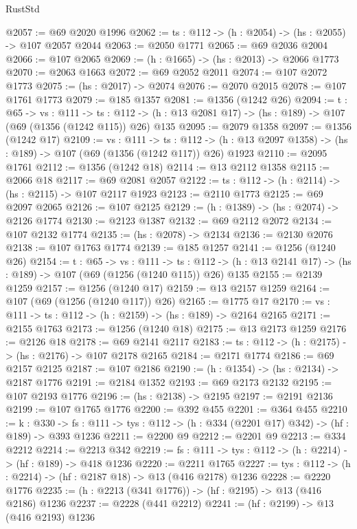\begin{lexlean}{RustStd}
\begin{coremodule}
{\begin{coremodule}
{{{@2057 := @69 @2020 @1996
@2062 := {ts : @112} -> (h : @2054) -> (hs : @2055) -> @107 @2057 @2044
@2063 := @2050 @1771
@2065 := @69 @2036 @2004
@2066 := @107 @2065
@2069 := (h : @1665) -> (hs : @2013) -> @2066 @1773
@2070 := @2063 @1663
@2072 := @69 @2052 @2011
@2074 := @107 @2072 @1773
@2075 := (hs : @2017) -> @2074
@2076 := @2070 @2015
@2078 := @107 @1761 @1773
@2079 := @185 @1357
@2081 := @1356 (@1242 @26)
@2094 := {t : @65} ->
  {vs : @111} ->
  {ts : @112} -> (h : @13 @2081 @17) -> (hs : @189) -> @107 (@69 (@1356 (@1242 @115)) @26) @135
@2095 := @2079 @1358
@2097 := @1356 (@1242 @17)
@2109 := {vs : @111} ->
  {ts : @112} -> (h : @13 @2097 @1358) -> (hs : @189) -> @107 (@69 (@1356 (@1242 @117)) @26) @1923
@2110 := @2095 @1761
@2112 := @1356 (@1242 @18)
@2114 := @13 @2112 @1358
@2115 := @2066 @18
@2117 := @69 @2081 @2057
@2122 := {ts : @112} -> (h : @2114) -> (hs : @2115) -> @107 @2117 @1923
@2123 := @2110 @1773
@2125 := @69 @2097 @2065
@2126 := @107 @2125
@2129 := (h : @1389) -> (hs : @2074) -> @2126 @1774
@2130 := @2123 @1387
@2132 := @69 @2112 @2072
@2134 := @107 @2132 @1774
@2135 := (hs : @2078) -> @2134
@2136 := @2130 @2076
@2138 := @107 @1763 @1774
@2139 := @185 @1257
@2141 := @1256 (@1240 @26)
@2154 := {t : @65} ->
  {vs : @111} ->
  {ts : @112} -> (h : @13 @2141 @17) -> (hs : @189) -> @107 (@69 (@1256 (@1240 @115)) @26) @135
@2155 := @2139 @1259
@2157 := @1256 (@1240 @17)
@2159 := @13 @2157 @1259
@2164 := @107 (@69 (@1256 (@1240 @117)) @26)
@2165 := @1775 @17
@2170 := {vs : @111} -> {ts : @112} -> (h : @2159) -> (hs : @189) -> @2164 @2165
@2171 := @2155 @1763
@2173 := @1256 (@1240 @18)
@2175 := @13 @2173 @1259
@2176 := @2126 @18
@2178 := @69 @2141 @2117
@2183 := {ts : @112} -> (h : @2175) -> (hs : @2176) -> @107 @2178 @2165
@2184 := @2171 @1774
@2186 := @69 @2157 @2125
@2187 := @107 @2186
@2190 := (h : @1354) -> (hs : @2134) -> @2187 @1776
@2191 := @2184 @1352
@2193 := @69 @2173 @2132
@2195 := @107 @2193 @1776
@2196 := (hs : @2138) -> @2195
@2197 := @2191 @2136
@2199 := @107 @1765 @1776
@2200 := @392 @455
@2201 := @364 @455
@2210 := {k : @330} ->
  {fs : @111} -> {tys : @112} -> (h : @334 (@2201 @17) @342) -> (hf : @189) -> @393 @1236
@2211 := @2200 @9
@2212 := @2201 @9
@2213 := @334 @2212
@2214 := @2213 @342
@2219 := {fs : @111} -> {tys : @112} -> (h : @2214) -> (hf : @189) -> @418 @1236
@2220 := @2211 @1765
@2227 := {tys : @112} -> (h : @2214) -> (hf : @2187 @18) -> @13 (@416 @2178) @1236
@2228 := @2220 @1776
@2235 := (h : @2213 (@341 @1776)) -> (hf : @2195) -> @13 (@416 @2186) @1236
@2237 := @2228 (@441 @2212)
@2241 := (hf : @2199) -> @13 (@416 @2193) @1236
}}}
\end{coremodule}}
\end{coremodule}
\end{lexlean}

